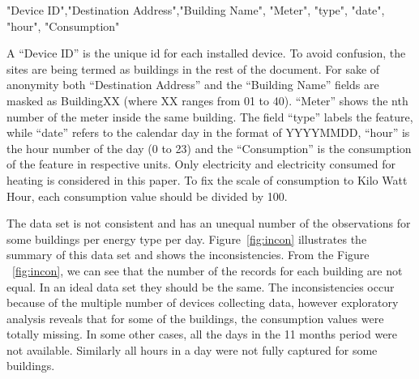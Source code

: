"Device ID","Destination Address","Building Name", "Meter", "type", "date", "hour", "Consumption"

A ``Device ID'' is the unique id for each installed device. To avoid confusion, the sites are being termed as buildings in the rest of the document. For sake of anonymity both ``Destination Address'' and the ``Building Name'' fields are masked as BuildingXX (where XX ranges from  01 to 40). ``Meter'' shows the nth number of the meter inside the same building. The field ``type'' labels the feature, while ``date'' refers to the calendar day in the format of YYYYMMDD, ``hour'' is the hour number of the day (0 to 23) and the ``Consumption'' is the consumption of the feature in respective units. Only electricity and electricity consumed for heating is considered in this paper. To fix the scale of consumption to Kilo Watt Hour, each consumption value should be divided by 100. 

The data set is not consistent and has an unequal number of the observations for some buildings per energy type per day. Figure~\ref{fig:incon} illustrates the summary of this data set and shows the inconsistencies. From the Figure ~\ref{fig:incon}, we can see that the number of the records for each building are not equal. In an ideal data set they should be the same. The inconsistencies occur because of the multiple number of devices collecting data, however exploratory analysis reveals that for some of the buildings, the consumption values were totally missing. In some other cases, all the days in the 11 months period were not available. Similarly all hours in a day were not fully captured for some buildings.

